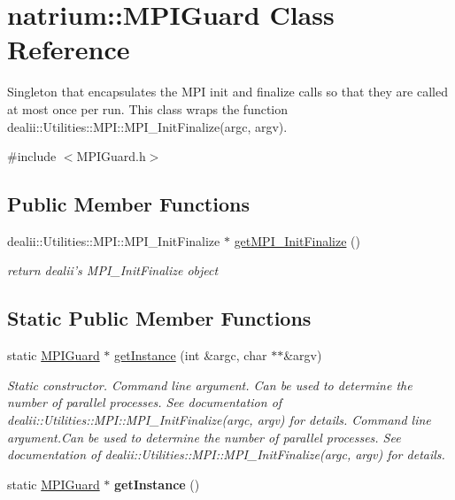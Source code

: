 \hypertarget{classnatrium_1_1MPIGuard}{
\section{natrium::MPIGuard Class Reference}
\label{classnatrium_1_1MPIGuard}
}


Singleton that encapsulates the MPI init and finalize calls so that they are called at most once per run. This class wraps the function dealii::Utilities::MPI::MPI\_\-InitFinalize(argc, argv).  


{\ttfamily \#include $<$MPIGuard.h$>$}\subsection*{Public Member Functions}
\begin{DoxyCompactItemize}
\item 
\hypertarget{classnatrium_1_1MPIGuard_a3211b8cb3a966a3f776eb669ae3ef0fe}{
dealii::Utilities::MPI::MPI\_\-InitFinalize $\ast$ \hyperlink{classnatrium_1_1MPIGuard_a3211b8cb3a966a3f776eb669ae3ef0fe}{getMPI\_\-InitFinalize} ()}
\label{classnatrium_1_1MPIGuard_a3211b8cb3a966a3f776eb669ae3ef0fe}

\begin{DoxyCompactList}\small\item\em return dealii's MPI\_\-InitFinalize object \item\end{DoxyCompactList}\end{DoxyCompactItemize}
\subsection*{Static Public Member Functions}
\begin{DoxyCompactItemize}
\item 
\hypertarget{classnatrium_1_1MPIGuard_a224d510033f3ef22368c3ccecf5fdab8}{
static \hyperlink{classnatrium_1_1MPIGuard}{MPIGuard} $\ast$ \hyperlink{classnatrium_1_1MPIGuard_a224d510033f3ef22368c3ccecf5fdab8}{getInstance} (int \&argc, char $\ast$$\ast$\&argv)}
\label{classnatrium_1_1MPIGuard_a224d510033f3ef22368c3ccecf5fdab8}

\begin{DoxyCompactList}\small\item\em Static constructor.  Command line argument. Can be used to determine the number of parallel processes. See documentation of dealii::Utilities::MPI::MPI\_\-InitFinalize(argc, argv) for details.  Command line argument.Can be used to determine the number of parallel processes. See documentation of dealii::Utilities::MPI::MPI\_\-InitFinalize(argc, argv) for details. \item\end{DoxyCompactList}\item 
\hypertarget{classnatrium_1_1MPIGuard_a29d560de3666736bbecd800932a7209d}{
static \hyperlink{classnatrium_1_1MPIGuard}{MPIGuard} $\ast$ {\bfseries getInstance} ()}
\label{classnatrium_1_1MPIGuard_a29d560de3666736bbecd800932a7209d}

\end{DoxyCompactItemize}
